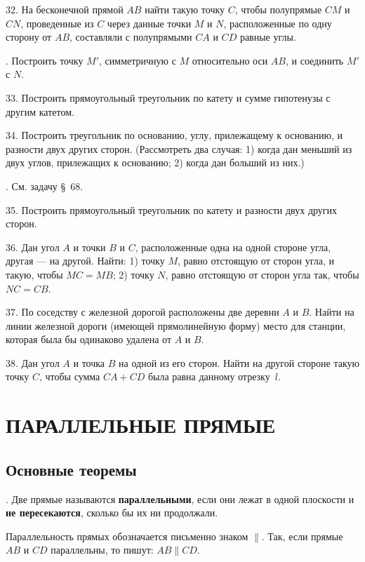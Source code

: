 \documentclass[oneside]{book}
\begin{document}
32.
На бесконечной прямой $AB$ найти такую точку $C$, чтобы полупрямые $CM$ и $CN$, проведенные из $C$ через данные точки $M$ и $N$, расположенные по одну сторону от $AB$, составляли с полупрямыми $CA$ и $CD$ равные углы.

.
Построить точку $M'$, симметричную с $M$ относительно оси $AB$, и соединить $M'$ с $N$.

33.
Построить прямоугольный треугольник по катету и сумме гипотенузы с другим катетом.

34.
Построить треугольник по основанию, углу, прилежащему к основанию, и разности двух других сторон.
(Рассмотреть два случая:
1) когда дан меньший из двух углов, прилежащих к основанию;
2) когда дан больший из них.)

.
См.
задачу §~68.

35.
Построить прямоугольный треугольник по катету и разности двух других сторон.

36.
Дан угол $A$ и точки $B$ и $C$, расположенные одна на одной стороне угла, другая — на другой.
Найти:
1) точку $M$, равно отстоящую от сторон угла, и такую, чтобы $MC=MB$;
2) точку $N$, равно отстоящую от сторон угла так, чтобы $NC=CB$.

37.
По соседству с железной дорогой расположены две деревни $A$ и $B$.
Найти на линии железной дороги (имеющей прямолинейную форму) место для станции, которая была бы одинаково удалена от $A$ и $B$.

38.
Дан угол $A$ и точка $B$ на одной из его сторон.
Найти на другой стороне такую точку $C$, чтобы сумма $CA+CD$ была равна данному отрезку~$l$.


\section{ПАРАЛЛЕЛЬНЫЕ ПРЯМЫЕ}

\subsection*{Основные теоремы}

.
Две прямые называются \textbf{параллельными}, если они лежат в одной плоскости и \textbf{не пересекаются}, сколько бы их ни продолжали.

Параллельность прямых обозначается письменно знаком $\parallel$.
Так, если прямые $AB$ и $CD$ параллельны, то пишут:
$AB \parallel CD$. 
\end{document}
